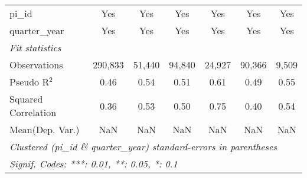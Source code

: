 \begin{tabular}{lcccccc}
   pi\_id                                                     & Yes           & Yes          & Yes            & Yes           & Yes            & Yes\\  
   quarter\_year                                              & Yes           & Yes          & Yes            & Yes           & Yes            & Yes\\  
   \midrule
   \emph{Fit statistics}\\
   Observations                                               & 290,833       & 51,440       & 94,840         & 24,927        & 90,366         & 9,509\\  
   Pseudo R$^2$                                               & 0.46          & 0.54         & 0.51           & 0.61          & 0.49           & 0.55\\  
   Squared Correlation                                        & 0.36          & 0.53         & 0.50           & 0.75          & 0.40           & 0.54\\  
Mean(Dep. Var.) & NaN & NaN & NaN & NaN & NaN & NaN \\
   \midrule \midrule
   \multicolumn{7}{l}{\emph{Clustered (pi\_id \& quarter\_year) standard-errors in parentheses}}\\
   \multicolumn{7}{l}{\emph{Signif. Codes: ***: 0.01, **: 0.05, *: 0.1}}\\
\end{tabular}
\par\endgroup
